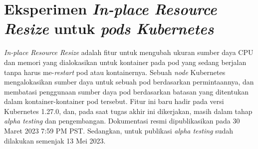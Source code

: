 \chapter{Eksperimen \textit{In-place Resource Resize} untuk \textit{pods Kubernetes}}
\label{appendix:eksperimen-in-place-resource-resize}

\textit{In-place Resource Resize} adalah fitur untuk mengubah ukuran sumber daya CPU dan memori yang dialokasikan untuk kontainer pada pod yang sedang berjalan tanpa harus me-\textit{restart} pod atau kontainernya. Sebuah \textit{node} Kubernetes mengalokasikan sumber daya untuk sebuah pod berdasarkan permintaannya, dan membatasi penggunaan sumber daya pod berdasarkan batasan yang ditentukan dalam kontainer-kontainer pod tersebut. Fitur ini baru hadir pada versi Kubernetes 1.27.0, dan, pada saat tugas akhir ini dikerjakan, masih dalam tahap \textit{alpha testing} dan pengembangan. Dokumentasi resmi dipublikasikan pada 30 Maret 2023 7:59 PM PST. Sedangkan, untuk publikasi \textit{alpha testing} sudah dilakukan semenjak 13 Mei 2023.

